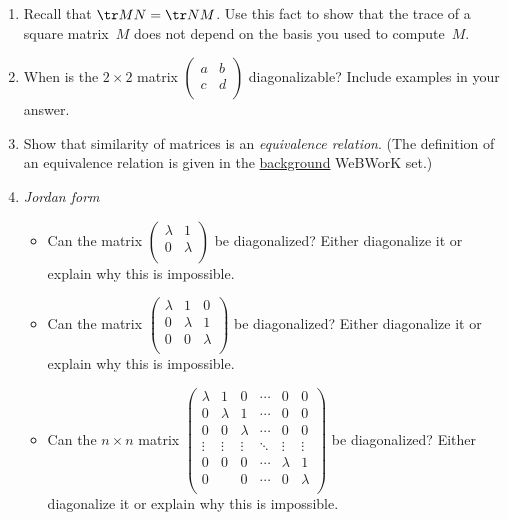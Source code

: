 \begin{enumerate}
\item Recall that $\tr MN = \tr NM$. Use this fact to show that the trace of a square matrix~$M$ does not depend on the basis you used to compute~$M$.



\item When is the $2\times 2$ matrix 
$\begin{pmatrix}
a & b \\
c & d \\
\end{pmatrix}$ diagonalizable?  Include examples in your answer.


\item Show that similarity of matrices is an \hypertarget{equivalence}{\emph{equivalence relation}}.  (The definition of an equivalence relation is given in the  \href{\webworkurl Background/4/}{background} WeBWorK set.)


\item {\it Jordan form} \label{prob_jordan_form}
\begin{itemize}
\item Can the matrix \(\begin{pmatrix}
\lambda & 1 \\
0 & \lambda \\
\end{pmatrix}\) be diagonalized? Either diagonalize it or explain why this is impossible.
\item Can the matrix \(\begin{pmatrix}
\lambda & 1 & 0 \\
0 & \lambda & 1 \\
0 & 0 & \lambda \\
\end{pmatrix}\) be diagonalized? Either diagonalize it or explain why this is impossible.
\item Can the \(n \times n\) matrix \(\begin{pmatrix}
\lambda & 1 & 0 & \cdots & 0 & 0 \\
0 & \lambda & 1 & \cdots & 0 & 0 \\
0 & 0 & \lambda & \cdots & 0 & 0 \\
\vdots & \vdots & \vdots & \ddots & \vdots & \vdots \\
0 & 0 & 0 & \cdots & \lambda & 1 \\
0 &  & 0 & \cdots & 0 & \lambda \\
\end{pmatrix}\) be diagonalized? Either diagonalize it or explain why this is impossible.


\end{itemize}
\end{enumerate}
